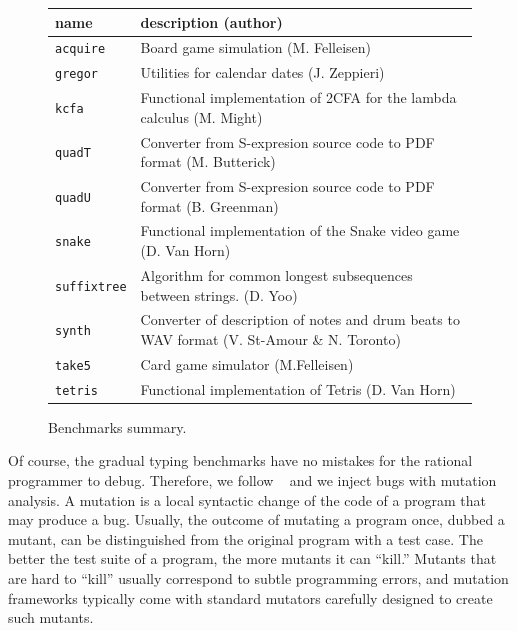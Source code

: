 \begin{figure}
\begin{tabular}{p{2cm} | p{10cm} }
  {\bf  name} & {\bf description (author)}  \\

\hline

  \texttt{acquire} & Board game simulation (M. Felleisen)  \\%


\hline
  \texttt{gregor} & Utilities for calendar dates (J. Zeppieri) \\%


\hline
  \texttt{kcfa} & Functional implementation of 2CFA for the lambda calculus (M. Might) \\%


\hline
  \texttt{quadT} & Converter from S-expresion source code to PDF format (M. Butterick)\\%

\hline
  \texttt{quadU} & Converter from S-expresion source code to PDF format  (B. Greenman) \\%

\hline
  \texttt{snake} & Functional implementation of the  Snake video game (D. Van Horn) \\%

\hline
  \texttt{suffixtree} & Algorithm for common longest subsequences between strings. (D. Yoo) \\%

\hline
  \texttt{synth} & Converter of description of notes and drum beats to WAV format (V. St-Amour \& N. Toronto) \\%

\hline
  \texttt{take5} & Card game simulator (M.Felleisen)  \\%

\hline
  \texttt{tetris} & Functional implementation of Tetris (D. Van Horn) \\%


\end{tabular}
  \caption{Benchmarks summary.}
  \label{table:benchmark-descriptions}
\end{figure}

Of course, the gradual typing benchmarks have no mistakes for the rational
programmer to debug. Therefore, we follow
~\citet{lksfd-popl-2020} and we inject bugs with mutation analysis.
A mutation is a local syntactic change of the code of a program that may
produce a bug.
Usually, the outcome of mutating a program
once, dubbed a mutant, can be distinguished from the original program with a test case.
The better the test suite of a program, the more mutants it can ``kill.''
Mutants that are hard to ``kill'' usually correspond to subtle programming errors, and mutation frameworks typically come with standard mutators carefully designed to create such mutants.

